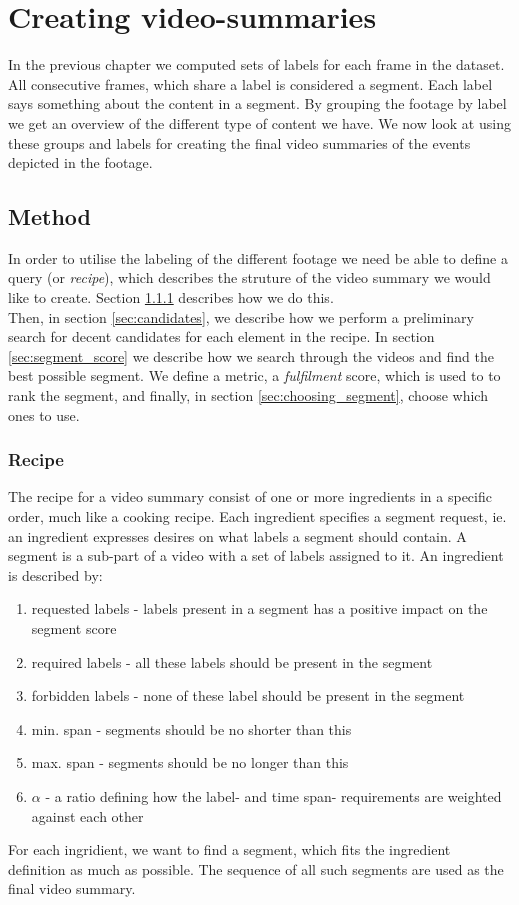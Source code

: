 %
\chapter{Creating video-summaries}
%
In the previous chapter we computed sets of labels for each frame in the dataset. All consecutive frames, which share a label is considered a segment. Each label says something about the content in a segment. By grouping the footage by label we get an overview of the different type of content we have. We now look at using these groups and labels for creating the final video summaries of the events depicted in the footage. 
%
\section{Method}
%
In order to utilise the labeling of the different footage we need be able to define a query (or \textit{recipe}), which describes the struture of the video summary we would like to create. Section \ref{sec:recipe} describes how we do this.\\
Then, in section \ref{sec:candidates}, we describe how we perform a preliminary search for decent candidates for each element in the recipe. In section \ref{sec:segment_score} we describe how we search through the videos and find the best possible segment. We define a metric, a \textit{fulfilment} score, which is used to to rank the segment, and finally, in section \ref{sec:choosing_segment}, choose which ones to use.
%
\subsection{Recipe}\label{sec:recipe}
%
The recipe for a video summary consist of one or more ingredients in a specific order, much like a cooking recipe. Each ingredient specifies a segment request, ie. an ingredient expresses desires on what labels a segment should contain. A segment is a sub-part of a video with a set of labels assigned to it. An ingredient is described by:
%
\begin{enumerate}
	\item requested labels - labels present in a segment has a positive impact on the segment score
	\item required labels - all these labels should be present in the segment
	\item forbidden labels - none of these label should be present in the segment
	\item min. span - segments should be no shorter than this
	\item max. span - segments should be no longer than this
	\item $\alpha$  - a ratio defining how the label- and time span- requirements are weighted against each other
\end{enumerate}
%
For each ingridient, we want to find a segment, which fits the ingredient definition as much as possible. The sequence of all such segments are used as the final video summary.
%
